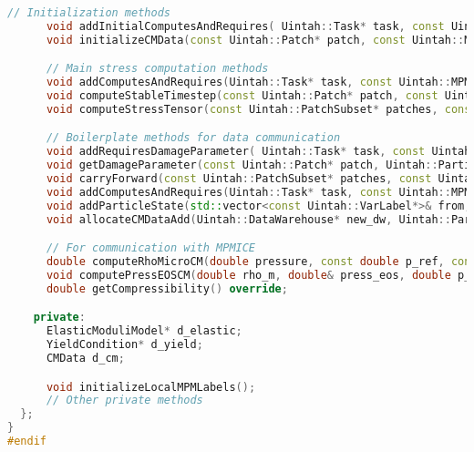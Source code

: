 \begin{enumerate}
\begin{lstlisting}[language=Cpp]
      // Initialization methods
      void addInitialComputesAndRequires( Uintah::Task* task, const Uintah::MPMMaterial* matl, const Uintah::PatchSet* patches) const override;
      void initializeCMData(const Uintah::Patch* patch, const Uintah::MPMMaterial* matl, Uintah::DataWarehouse* new_dw) override;

      // Main stress computation methods
      void addComputesAndRequires(Uintah::Task* task, const Uintah::MPMMaterial* matl, const Uintah::PatchSet* patches) const override;
      void computeStableTimestep(const Uintah::Patch* patch, const Uintah::MPMMaterial* matl, Uintah::DataWarehouse* new_dw) override;
      void computeStressTensor(const Uintah::PatchSubset* patches, const Uintah::MPMMaterial* matl, Uintah::DataWarehouse* old_dw, Uintah::DataWarehouse* new_dw) override;

      // Boilerplate methods for data communication
      void addRequiresDamageParameter( Uintah::Task* task, const Uintah::MPMMaterial* matl, const Uintah::PatchSet* patches) const override;
      void getDamageParameter(const Uintah::Patch* patch, Uintah::ParticleVariable<int>& damage, int dwi, Uintah::DataWarehouse* old_dw, Uintah::DataWarehouse* new_dw) override;
      void carryForward(const Uintah::PatchSubset* patches, const Uintah::MPMMaterial* matl, Uintah::DataWarehouse* old_dw, Uintah::DataWarehouse* new_dw) override;
      void addComputesAndRequires(Uintah::Task* task, const Uintah::MPMMaterial* matl, const Uintah::PatchSet* patches, const bool recursion, const bool dummy) const override;
      void addParticleState(std::vector<const Uintah::VarLabel*>& from, std::vector<const Uintah::VarLabel*>& to) override;
      void allocateCMDataAdd(Uintah::DataWarehouse* new_dw, Uintah::ParticleSubset* addset, Uintah::ParticleLabelVariableMap* newState, Uintah::ParticleSubset* delset, Uintah::DataWarehouse* old_dw) override;

      // For communication with MPMICE
      double computeRhoMicroCM(double pressure, const double p_ref, const Uintah::MPMMaterial* matl, double temperature, double rho_guess) override;
      void computePressEOSCM(double rho_m, double& press_eos, double p_ref, double& dp_drho, double& ss_new, const Uintah::MPMMaterial* matl, double temperature) override;
      double getCompressibility() override;

    private:
      ElasticModuliModel* d_elastic;
      YieldCondition* d_yield;
      CMData d_cm;

      void initializeLocalMPMLabels();
      // Other private methods
  };
}
#endif
\end{lstlisting}


\end{enumerate}
